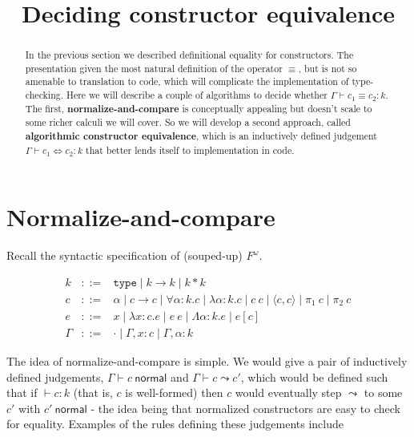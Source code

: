 \documentclass{amsart}
\title{Deciding constructor equivalence}
\newcommand{\type}{\ensuremath{\mathtt{type}}}
\begin{document}
\maketitle

\begin{abstract}
    In the previous section we described definitional equality for constructors.
    The presentation given the most natural definition of the operator $\equiv$,
    but is not so amenable to translation to code, which will complicate the
    implementation of type-checking. Here we will describe a couple of
    algorithms to decide whether $\Gamma \vdash c_1 \equiv c_2 : k$. The first,
    {\bf normalize-and-compare} is conceptually appealing but doesn't scale to
    some richer calculi we will cover. So we will develop a second approach,
    called {\bf algorithmic constructor equivalence}, which is an inductively
    defined judgement $\Gamma \vdash c_1 \iff c_2 : k$ that better lends itself
    to implementation in code.
\end{abstract}

\section{Normalize-and-compare}

\newcommand{\normal}[1]{#1 \ \mathsf{normal}}

Recall the syntactic specification of (souped-up) $F^\omega$.

\[
  \begin{array}{lcl}
    k & ::= & \type \mid k \to k \mid k * k\\
    c & ::= & \alpha \mid c \to c \mid \forall \alpha : k. c
        \mid \lambda \alpha : k. c \mid c\ c \mid \langle c, c \rangle \mid \pi_1 \ c \mid \pi_2 \ c \\
    e & ::= & x \mid \lambda x : c. e \mid e\ e \mid
            \Lambda \alpha : k. e \mid e[c]\\
    \Gamma & ::= & \cdot \mid \Gamma, x : c \mid \Gamma, \alpha : k
  \end{array}
\]

The idea of normalize-and-compare is simple. We would give a pair of
inductively defined judgements, $\Gamma \vdash \normal{c}$ and $\Gamma
\vdash c \leadsto c'$, which would be defined such that if $\vdash c : k$
(that is, $c$ is well-formed) then $c$ would eventually step $\leadsto$ to
some $c'$ with $\normal{c'}$ - the idea being that normalized constructors
are easy to check for equality. Examples of the rules defining these
judgements include
\end{document}
